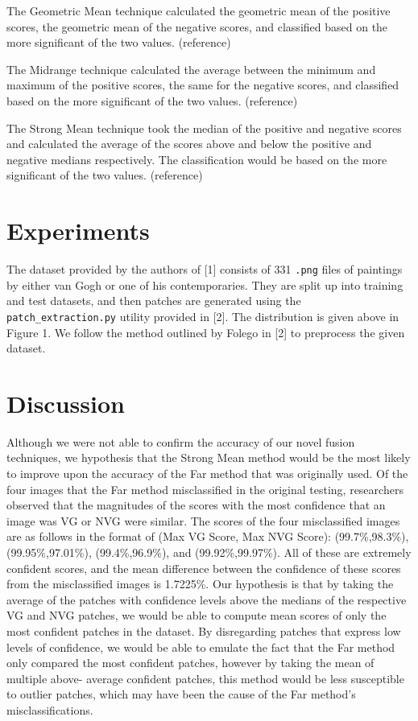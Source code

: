 \documentclass{article}
\begin{document}
The Geometric Mean technique calculated the geometric mean of the positive scores, the geometric mean of the negative scores, and classified based on the more significant of the two values. (reference)

The Midrange technique calculated the average between the minimum and maximum of the positive scores, the same for the negative scores, and classified based on the more significant of the two values. (reference)

The Strong Mean technique took  the median of the positive and negative scores and calculated the average of the scores above and below the positive and negative medians respectively. The classification would be based on the more significant of the two values. (reference)




\section{Experiments}

The dataset provided by the authors of [1] consists of 331 \texttt{.png} files of paintings by either van Gogh or one of his contemporaries. They are split up into training and test datasets, and then patches are generated using the \texttt{patch\_extraction.py} utility provided in [2]. The distribution is given above in Figure 1. 
We follow the method outlined by Folego in [2] to preprocess the given dataset. 

\section{Discussion}

Although we were not able to confirm the accuracy of our novel fusion techniques, we hypothesis that the Strong Mean method would be the most likely to improve upon the accuracy of the Far method that was originally used. Of the four images that the Far method misclassified in the original testing, researchers observed that the magnitudes of the scores with the most confidence that an image was VG or NVG were similar. The scores of the four misclassified images are as follows in  the format of  (Max VG Score, Max NVG Score): (99.7\%,98.3\%), (99.95\%,97.01\%), (99.4\%,96.9\%), and (99.92\%,99.97\%). All of these are extremely confident scores, and the mean difference between the confidence of these scores from the misclassified images is 1.7225\%. Our hypothesis is that by taking the average of the patches with confidence levels above the medians of the respective VG and NVG patches, we would be able to compute mean scores of only the most confident patches in the dataset. By disregarding patches that express low levels of confidence, we would be able to emulate the fact that the Far method only compared the most confident patches, however by taking the mean of multiple above- average confident patches, this method would be less susceptible to outlier patches, which may have been the cause of the Far method’s misclassifications. 
\end{document}

